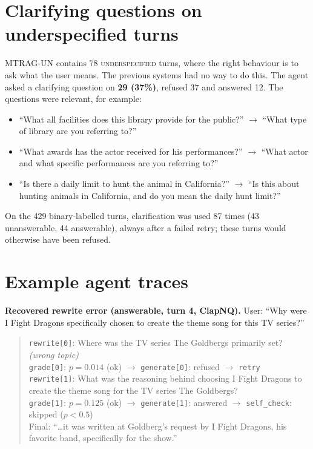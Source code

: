 \documentclass[11pt,a4paper]{report}
\begin{document}
\section{Clarifying questions on underspecified turns}
MTRAG-UN contains 78 \textsc{underspecified} turns, where the right behaviour is to ask what the user means. The previous systems had no way to do this. The agent asked a clarifying question on \textbf{29 (37\%)}, refused 37 and answered 12. The questions were relevant, for example:
\begin{itemize}
\item ``What all facilities does this library provide for the public?'' $\rightarrow$ ``What type of library are you referring to?''
\item ``What awards has the actor received for his performances?'' $\rightarrow$ ``What actor and what specific performances are you referring to?''
\item ``Is there a daily limit to hunt the animal in California?'' $\rightarrow$ ``Is this about hunting animals in California, and do you mean the daily hunt limit?''
\end{itemize}
On the 429 binary-labelled turns, clarification was used 87 times (43 unanswerable, 44 answerable), always after a failed retry; these turns would otherwise have been refused.

\section{Example agent traces}
\textbf{Recovered rewrite error (answerable, turn 4, ClapNQ).} User: ``Why were I Fight Dragons specifically chosen to create the theme song for this TV series?''
\begin{quote}\small
\texttt{rewrite[0]}: Where was the TV series The Goldbergs primarily set? \emph{(wrong topic)}\\
\texttt{grade[0]}: $p=0.014$ (ok) $\rightarrow$ \texttt{generate[0]}: refused $\rightarrow$ \texttt{retry}\\
\texttt{rewrite[1]}: What was the reasoning behind choosing I Fight Dragons to create the theme song for the TV series The Goldbergs?\\
\texttt{grade[1]}: $p=0.125$ (ok) $\rightarrow$ \texttt{generate[1]}: answered $\rightarrow$ \texttt{self\_check}: skipped ($p<0.5$)\\
Final: ``\ldots it was written at Goldberg's request by I Fight Dragons, his favorite band, specifically for the show.''
\end{quote}
\end{document}
